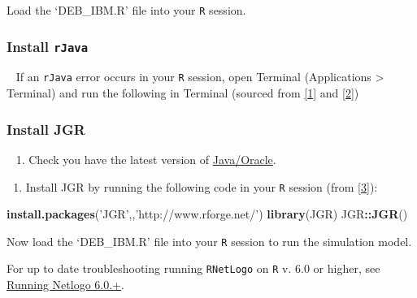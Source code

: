 \documentclass[10,portrait]{article}
\newenvironment{Shaded}{\begin{snugshade}}{\end{snugshade}}
\newcommand{\KeywordTok}[1]{\textcolor[rgb]{0.13,0.29,0.53}{\textbf{#1}}}
\newcommand{\StringTok}[1]{\textcolor[rgb]{0.31,0.60,0.02}{#1}}
\newcommand{\FunctionTok}[1]{\textcolor[rgb]{0.00,0.00,0.00}{#1}}
\newcommand{\VariableTok}[1]{\textcolor[rgb]{0.00,0.00,0.00}{#1}}
\newcommand{\OperatorTok}[1]{\textcolor[rgb]{0.81,0.36,0.00}{\textbf{#1}}}
\newcommand{\ExtensionTok}[1]{#1}
\newcommand{\NormalTok}[1]{#1}
\providecommand{\tightlist}{%
  \setlength{\itemsep}{0pt}\setlength{\parskip}{0pt}}
\begin{document}
Load the `DEB\_IBM.R' file into your \texttt{R} session.

\subsubsection{\texorpdfstring{Install
\texttt{rJava}}{Install rJava}}\label{install-rjava}

~ If an \texttt{rJava} error occurs in your \texttt{R} session, open
Terminal (Applications \textgreater{} Terminal) and run the following in
Terminal (sourced from \protect\hyperlink{references}{{[}1{]}} and
\protect\hyperlink{references}{{[}2{]}}) ~

\begin{Shaded}
\end{Shaded}

\hypertarget{install-jgr}{\subsubsection{Install
JGR}\label{install-jgr}}

~ 1. Check you have the latest version of
\href{https://www.oracle.com/technetwork/java/javase/downloads/index-jsp-138363.html}{Java/Oracle}.

\begin{enumerate}
\def\labelenumi{\arabic{enumi}.}
\setcounter{enumi}{1}
\tightlist
\item
  Install JGR by running the following code in your \texttt{R} session
  (from \protect\hyperlink{references}{{[}3{]}}):
\end{enumerate}

\begin{Shaded}
\begin{Highlighting}[]
\KeywordTok{install.packages}\NormalTok{(}\StringTok{'JGR'}\NormalTok{,,}\StringTok{'http://www.rforge.net/'}\NormalTok{)}
\KeywordTok{library}\NormalTok{(JGR)}
\NormalTok{JGR}\OperatorTok{::}\KeywordTok{JGR}\NormalTok{()}
\end{Highlighting}
\end{Shaded}

Now load the `DEB\_IBM.R' file into your \texttt{R} session to run the
simulation model.

For up to date troubleshooting running \texttt{RNetLogo} on \texttt{R}
v. 6.0 or higher, see
\href{https://github.com/NetLogo/NetLogo/issues/1282}{Running Netlogo
6.0.+}.
\end{document}
